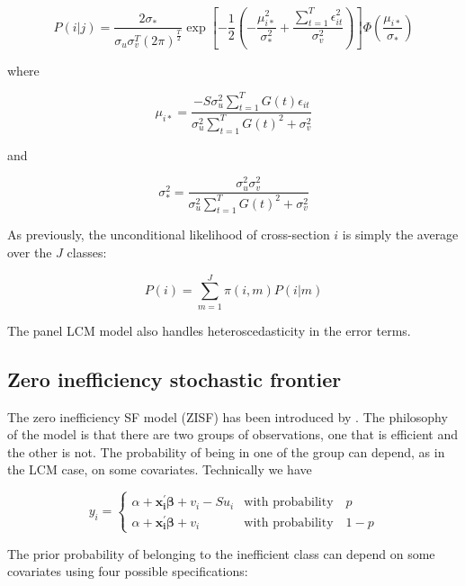 \documentclass[nojss]{jss}
\begin{document}
\begin{equation}\label{eq:8}
 P(i|j) = \frac{2\sigma_*}{\sigma_u\sigma_v^T\left(2\pi\right)^{\frac{T}{2}}}\exp{\left[-\frac{1}{2}\left(-\frac{\mu_{i*}^2}{\sigma_*^2} + \frac{\sum_{t=1}^T\epsilon_{it}^2}{\sigma_v^2}\right)\right]}\Phi\left(\frac{\mu_{i*}}{\sigma_*}\right)
\end{equation}

where

$$\mu_{i*} = \frac{-S\sigma_u^2\sum_{t=1}^TG(t)\epsilon_{it}}{\sigma_u^2\sum_{t=1}^TG(t)^2 + \sigma_v^2}$$

and

$$\sigma_*^2=\frac{\sigma_u^2\sigma_v^2}{\sigma_u^2\sum_{t=1}^TG(t)^2 + \sigma_v^2}$$

As previously, the unconditional likelihood of cross-section $i$ is simply the average
 over the $J$ classes:

$$P(i) = \sum_{m=1}^{J}\pi(i,m)P(i|m)$$

The panel LCM model also handles heteroscedasticity in the error terms.

\subsection{Zero inefficiency stochastic frontier}

The zero inefficiency SF model (ZISF) has been introduced by \citet{kpt13}. The 
philosophy of the model is that there are two groups of observations, one that is
efficient and the other is not. The probability of being in one of the group can 
depend, as in the LCM case, on some covariates. Technically we have

\begin{equation}\label{eq:9}
y_i = \begin{cases}
\alpha + \mathbf{x_i^{\prime}}\bm{\beta} + 
 v_i - Su_i & \text{with probability} \quad p \\
 \alpha + \mathbf{x_i^{\prime}}\bm{\beta} +
  v_i & \text{with probability} \quad 1-p
\end{cases}
\end{equation}

The prior probability of belonging to the inefficient class can depend on 
some covariates using four possible specifications: 
\end{document}
